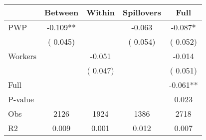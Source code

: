 
\begin{tabular}{l*{4}{c}}\hline&\multicolumn{1}{c}{Between}&\multicolumn{1}{c}{Within}&\multicolumn{1}{c}{Spillovers}&\multicolumn{1}{c}{Full}\\ \hline
 PWP           &             -0.109**      &                                               &       -0.063 &        -0.087*                            \\ 
                               &        (       0.045)           &                                       &       (       0.054)     &      (       0.052)                                           \\ 
 Workers       &                                               &       -0.051    &                                &            -0.014                            \\ 
                               &                                               & (       0.047)                  &                                        &      (       0.051)                                           \\ 
\hline                                                                                                                                                                                                                                            
 Full                  &                                               &                                               &                                        &            -0.061**                                     \\ 
 P-value               &                                               &                                               &                                        &             0.023                                           \\ 
 Obs                   &               2126               &       1924                       &       1386                &              2718                                               \\ 
 R2                    &                      0.009              &              0.001                      &              0.012               &                     0.007                                              \\ 
\hline \end{tabular}                                                                                                                                                                                                              